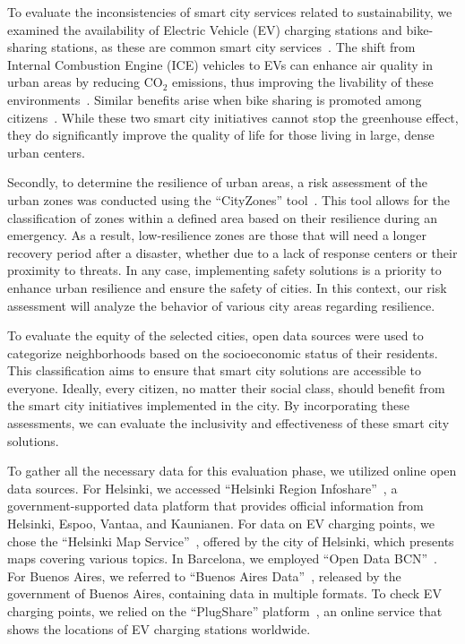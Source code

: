 \documentclass[smartcities,article,submit,pdftex,moreauthors]{Definitions/mdpi}
\begin{document}
To evaluate the inconsistencies of smart city services related to sustainability, we examined the availability of Electric Vehicle (EV) charging stations and bike-sharing stations, as these are common smart city services~\cite{bittencourtSurveyAdaptiveSmart2024}. The shift from Internal Combustion Engine (ICE) vehicles to EVs can enhance air quality in urban areas by reducing $\text{CO}_2$ emissions, thus improving the livability of these environments~\cite{ev_qualidade_ar}. Similar benefits arise when bike sharing is promoted among citizens~\cite{bike_qualidade_ar}. While these two smart city initiatives cannot stop the greenhouse effect, they do significantly improve the quality of life for those living in large, dense urban centers.

Secondly, to determine the resilience of urban areas, a risk assessment of the urban zones was conducted using the ``CityZones'' tool~\cite{cityzones_flood}. This tool allows for the classification of zones within a defined area based on their resilience during an emergency. As a result, low-resilience zones are those that will need a longer recovery period after a disaster, whether due to a lack of response centers or their proximity to threats. In any case, implementing safety solutions is a priority to enhance urban resilience and ensure the safety of cities. In this context, our risk assessment will analyze the behavior of various city areas regarding resilience.

To evaluate the equity of the selected cities, open data sources were used to categorize neighborhoods based on the socioeconomic status of their residents. This classification aims to ensure that smart city solutions are accessible to everyone. Ideally, every citizen, no matter their social class, should benefit from the smart city initiatives implemented in the city. By incorporating these assessments, we can evaluate the inclusivity and effectiveness of these smart city solutions.

To gather all the necessary data for this evaluation phase, we utilized online open data sources. For Helsinki, we accessed ``Helsinki Region Infoshare''~\cite{dados_helsinki}, a government-supported data platform that provides official information from Helsinki, Espoo, Vantaa, and Kaunianen. For data on EV charging points, we chose the ``Helsinki Map Service''~\cite{dados_helsinki_ev}, offered by the city of Helsinki, which presents maps covering various topics. In Barcelona, we employed ``Open Data BCN''~\cite{dados_barcelona}. For Buenos Aires, we referred to ``Buenos Aires Data''~\cite{dados_buenos_aires}, released by the government of Buenos Aires, containing data in multiple formats. To check EV charging points, we relied on the ``PlugShare'' platform~\cite{dados_buenos_aires_ev}, an online service that shows the locations of EV charging stations worldwide.
\end{document}
